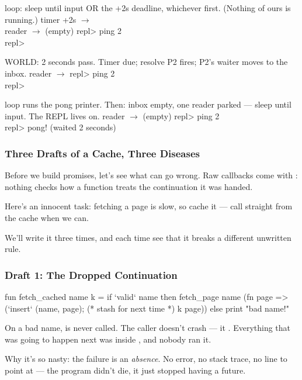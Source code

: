 \documentclass[aspectratio=169]{beamer}
\begin{document}
  {loop: sleep until input OR the +2s deadline, whichever first.
   (Nothing of ours is running.)}
  {timer +2s $\to$ \\
   reader\hspace{2.1em} $\to$ }
  {(empty)}
  {repl> ping 2\\ repl> }

  {WORLD: 2 seconds pass. Timer due; resolve P2 fires; P2's waiter
   moves to the inbox.}
  {reader $\to$ }
  {}
  {repl> ping 2\\ repl> }

  {loop runs the pong printer. Then: inbox empty, one reader parked
   --- sleep until input. The REPL lives on.}
  {reader $\to$ }
  {(empty)}
  {repl> ping 2\\ repl> pong! (waited 2 seconds)}


\begin{frame}[fragile]
  \frametitle{Three Drafts of a Cache, Three Diseases}

  Before we build promises, let's see what can go wrong. Raw callbacks come with
  : nothing checks how a function treats the
  continuation it was handed.

  \pause
  \vspace{\fill}

  Here's an innocent task: fetching a page is slow, so cache it ---
  call  straight from the cache when we can.

  \pause
  \vspace{\fill}

  We'll write it three times, and each time see that it breaks a
  different unwritten rule.
\end{frame}

\begin{frame}[fragile]
  \frametitle{Draft 1: The Dropped Continuation}

  \begin{codeblock}
    fun fetch_cached name k =
      if `valid` name
      then fetch_page name (fn page =>
             (`insert` (name, page);   (* stash for next time *)
              k page))
      else print "bad name!"
\end{codeblock}

  \pause
  \vspace{\fill}

  On a bad name,  is never called. The caller doesn't crash ---
  it . Everything that was going to
  happen next was inside , and nobody ran it.

  \pause
  \vspace{\fill}

  Why it's so nasty: the failure is an \textit{absence}. No error, no
  stack trace, no line to point at --- the program didn't die, it just
  stopped having a future.
\end{frame}
\end{document}
